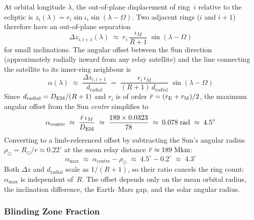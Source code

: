 At orbital longitude $\lambda$, the out-of-plane displacement of ring~$i$ relative
to the ecliptic is $z_i(\lambda) = r_i \sin\iota_i \sin(\lambda - \Omega)$.
Two adjacent rings ($i$ and $i\!+\!1$) therefore have an out-of-plane separation
%
\begin{equation}
  \Delta z_{i,i+1}(\lambda) \;\approx\;
  r_i \,\frac{\iota_M}{R+1}\;\sin(\lambda - \Omega)
\end{equation}
%
for small inclinations. The angular offset between the Sun direction (approximately
radially inward from any relay satellite) and the line connecting the satellite to
its inner-ring neighbour is
%
\begin{equation}\label{eq:alpha-offset}
  \alpha(\lambda) \;\approx\; \frac{\Delta z_{i,i+1}}{d_{\mathrm{radial}}}
  \;=\; \frac{r_i\,\iota_M}{(R+1)\,d_{\mathrm{radial}}}\;\sin(\lambda - \Omega)
\end{equation}
%
Since $d_{\mathrm{radial}} = D_{\mathrm{EM}}/(R+1)$ and $r_i$ is of order $\bar{r} = (r_{\mathrm{E}} + r_{\mathrm{M}})/2$,
the maximum angular offset from the Sun \emph{centre} simplifies to
%
\begin{equation}
  \alpha_{\mathrm{centre}} \;\approx\; \frac{\bar{r}\,\iota_M}{D_{\mathrm{EM}}}
  \;\approx\; \frac{189 \times 0.0323}{78}
  \;\approx\; 0.078\;\text{rad}
  \;\approx\; 4.5^\circ
\end{equation}
%
Converting to a limb-referenced offset by subtracting the Sun's angular radius
$\rho_\odot = R_\odot / r \approx 0.22^\circ$ at the mean relay distance
$\bar{r} \approx 189\;\text{Mkm}$:
%
\begin{equation}\label{eq:alpha-max}
  \alpha_{\max} \;\approx\; \alpha_{\mathrm{centre}} - \rho_\odot
  \;\approx\; 4.5^\circ - 0.2^\circ
  \;\approx\; 4.3^\circ
\end{equation}
%
Both $\Delta z$ and $d_{\mathrm{radial}}$ scale as $1/(R+1)$, so their ratio
cancels the ring count: $\alpha_{\max}$ is independent of~$R$. The offset depends
only on the mean orbital radius, the inclination difference, the Earth--Mars gap,
and the solar angular radius.

\subsubsection{Blinding Zone Fraction}

